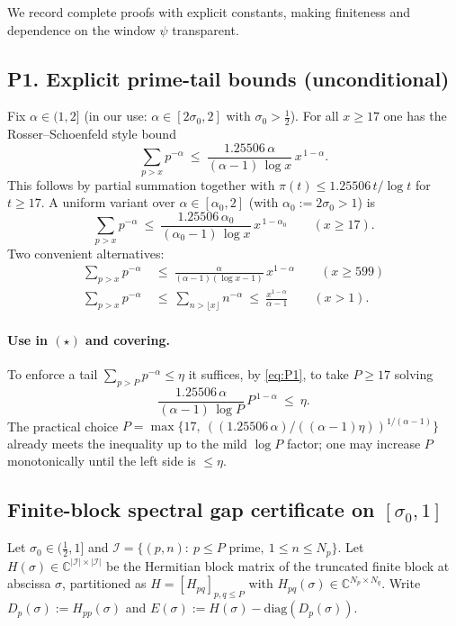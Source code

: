 \documentclass[11pt]{article}
\theoremstyle{definition}
\theoremstyle{remark}
\newcommand{\C}{\mathbb{C}}
\begin{document}
We record complete proofs with explicit constants, making finiteness and dependence on the window $\psi$ transparent.


\subsection*{P1. Explicit prime-tail bounds (unconditional)}\label{subsec:prime-tail}
Fix $\alpha\in(1,2]$ (in our use: $\alpha\in[2\sigma_0,2]$ with $\sigma_0>\tfrac12$). For all $x\ge 17$ one has the Rosser--Schoenfeld style bound
\begin{equation}\label{eq:P1}
 \sum_{p>x} p^{-\alpha}\ \le\ \frac{1.25506\,\alpha}{(\alpha-1)\,\log x}\,x^{\,1-\alpha}.
\end{equation}
This follows by partial summation together with $\pi(t)\le 1.25506\,t/\log t$ for $t\ge 17$. A uniform variant over $\alpha\in[\alpha_0,2]$ (with $\alpha_0:=2\sigma_0>1$) is
\begin{equation}\label{eq:P1uniform}
 \sum_{p>x} p^{-\alpha}\ \le\ \frac{1.25506\,\alpha_0}{(\alpha_0-1)\,\log x}\,x^{\,1-\alpha_0}\qquad(x\ge 17).
\end{equation}
Two convenient alternatives:
\begin{align}
 \sum_{p>x}p^{-\alpha}&\ \le\ \frac{\alpha}{(\alpha-1)(\log x-1)}\,x^{1-\alpha}\qquad(x\ge 599)\label{eq:P1dusart}\\
 \sum_{p>x}p^{-\alpha}&\ \le\ \sum_{n>\lfloor x\rfloor}n^{-\alpha}\ \le\ \frac{x^{1-\alpha}}{\alpha-1}\qquad(x>1).\label{eq:P1triv}
\end{align}
\paragraph{Use in $(\star)$ and covering.}
To enforce a tail $\sum_{p>P}p^{-\alpha}\le \eta$ it suffices, by \eqref{eq:P1}, to take $P\ge17$ solving
\[
 \frac{1.25506\,\alpha}{(\alpha-1)\,\log P}\,P^{\,1-\alpha}\ \le\ \eta.
\]
The practical choice $P=\max\{17,\ ((1.25506\,\alpha)/((\alpha-1)\eta))^{1/(\alpha-1)}\}$ already meets the inequality up to the mild $\log P$ factor; one may increase $P$ monotonically until the left side is $\le\eta$.

\subsection*{Finite-block spectral gap certificate on $[\sigma_0,1]$}
Let $\sigma_0\in(\tfrac12,1]$ and $\mathcal I=\{(p,n):\ p\le P\text{ prime},\ 1\le n\le N_p\}$. Let $H(\sigma)\in\C^{|\mathcal I|\times|\mathcal I|}$ be the Hermitian block matrix of the truncated finite block at abscissa $\sigma$, partitioned as $H=[H_{pq}]_{p,q\le P}$ with $H_{pq}(\sigma)\in\C^{N_p\times N_q}$. Write $D_p(\sigma):=H_{pp}(\sigma)$ and $E(\sigma):=H(\sigma)-\mathrm{diag}(D_p(\sigma))$.
\end{document}
